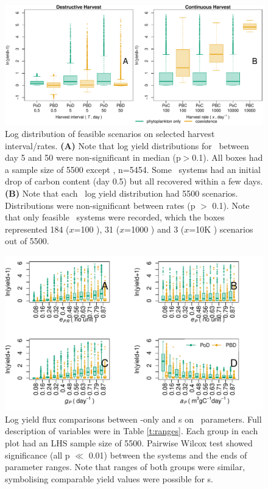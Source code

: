 \documentclass[../thesis.tex]{subfiles} %
\begin{document}
\begin{figure}[H]
    \centering
    \includegraphics[width=\linewidth]{result/Harvest.pdf}
    \caption[Yield flux distribution by harvest mode]{Log distribution of feasible scenarios on selected harvest interval/rates.  \textbf{(A)}  Note that log yield distributions for \PoN\ between day 5 and 50 were non-significant in median (p$>$0.1).  All boxes had a sample size of 5500 except \PBN, n=5454.  Some \PBN\ systems had an initial drop of carbon content (day 0.5) but all recovered within a few days.  \textbf{(B)} Note that each \PoH\ log yield distribution had 5500 scenarios.  Distributions were non-significant between rates (p $>$ 0.1).  Note that only feasible \PBN\ systems were recorded, which the boxes represented 184 ($x$=100 \dayU), 31 ($x$=1000 \dayU) and 3 ($x$=10K \dayU) scenarios out of 5500.}
    \label{f:ydByHarv}
\end{figure}

\begin{figure}[H]
    \centering
    \includegraphics[width=\linewidth]{result/bacEff1.pdf}
    \caption[Log yield flux comparisons between \phy-only and \pbs s on \phy\ parameters]{Log yield flux comparisons between \phy-only and \pbs s on \phy\ parameters.  Full description of variables were in Table \ref{t:ranges}.  Each group in each plot had an LHS sample size of 5500.  Pairwise Wilcox test showed significance (all p $\ll$ 0.01) between the systems and the ends of parameter ranges.  Note that ranges of both groups were similar, symbolising comparable yield values were possible for \pbs s.}
    \label{f:bacEffect}
\end{figure}
\end{document}
